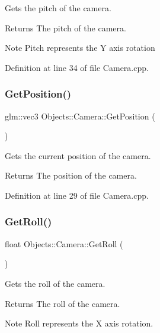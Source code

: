 Gets the pitch of the camera. \begin{DoxyReturn}{Returns}
The pitch of the camera. 
\end{DoxyReturn}
\begin{DoxyNote}{Note}
Pitch represents the Y axis rotation 
\end{DoxyNote}


Definition at line 34 of file Camera.\+cpp.

\mbox{\label{class_objects_1_1_camera_a8296a922839ed2ce11625d4062fdc00b}} 
\subsubsection{\texorpdfstring{Get\+Position()}{GetPosition()}}
{\footnotesize\ttfamily glm\+::vec3 Objects\+::\+Camera\+::\+Get\+Position (\begin{DoxyParamCaption}{ }\end{DoxyParamCaption})}

Gets the current position of the camera. \begin{DoxyReturn}{Returns}
The position of the camera. 
\end{DoxyReturn}


Definition at line 29 of file Camera.\+cpp.

\mbox{\label{class_objects_1_1_camera_a03d47a22c8591b487f11d30cff16323b}} 
\subsubsection{\texorpdfstring{Get\+Roll()}{GetRoll()}}
{\footnotesize\ttfamily float Objects\+::\+Camera\+::\+Get\+Roll (\begin{DoxyParamCaption}{ }\end{DoxyParamCaption})}

Gets the roll of the camera. \begin{DoxyReturn}{Returns}
The roll of the camera. 
\end{DoxyReturn}
\begin{DoxyNote}{Note}
Roll represents the X axis rotation. 
\end{DoxyNote}


